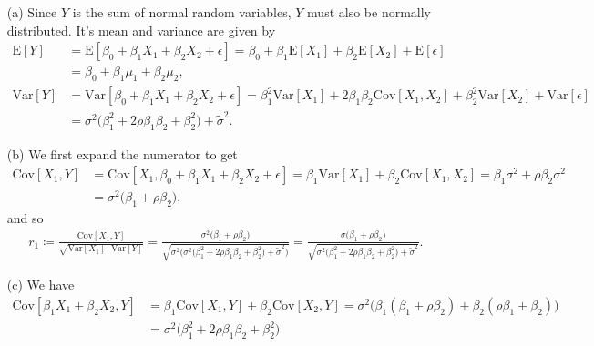 \documentclass[10pt]{article}
\begin{document}
\begin{itemize}
    \item[(a)] Since \(Y\) is the sum of normal random variables, \(Y\) must also be normally distributed. It's mean and variance are given by 
    \begin{align*}
        \mathrm{E}[Y]
        &= \mathrm{E}[\beta_0 + \beta_1 X_1 + \beta_2 X_2 + \epsilon]
        = \beta_0 + \beta_1 \mathrm{E}[X_1] + \beta_2 \mathrm{E}[X_2] + \mathrm{E}[\epsilon] \\
        &= \beta_0 + \beta_1 \mu_1 + \beta_2 \mu_2, \\
        \mathrm{Var}[Y]
        &= \mathrm{Var}[\beta_0 + \beta_1 X_1 + \beta_2 X_2 + \epsilon] 
        = \beta_1^2 \mathrm{Var}[X_1] + 2 \beta_1 \beta_2 \mathrm{Cov}[X_1, X_2] + \beta_2^2 \mathrm{Var}[X_2] + \mathrm{Var}[\epsilon] \\
        &= \sigma^2 \big( \beta_1^2 + 2 \rho \beta_1 \beta_2 + \beta_2^2 \big) + \tilde{\sigma}^2.
    \end{align*}
    \item[(b)] We first expand the numerator to get  
    \begin{align*}
        \mathrm{Cov}[X_1, Y]
        &= \mathrm{Cov}[X_1, \beta_0 + \beta_1 X_1 + \beta_2 X_2 + \epsilon]
        = \beta_1 \mathrm{Var}[X_1] + \beta_2 \mathrm{Cov}[X_1, X_2] 
        = \beta_1 \sigma^2 + \rho \beta_2 \sigma^2 \\
        &= \sigma^2 \big( \beta_1 + \rho \beta_2 \big),
    \end{align*}
    and so 
    \begin{align*}
        r_1 
        \coloneqq \frac{\mathrm{Cov}[X_1,Y]}{\sqrt{\mathrm{Var}[X_1] \cdot \mathrm{Var}[Y]}}
        = \frac{\sigma^2 \big( \beta_1 + \rho \beta_2 \big)}{\sqrt{\sigma^2 \Big( \sigma^2 \big( \beta_1^2 + 2 \rho \beta_1 \beta_2 + \beta_2^2 \big) + \tilde{\sigma}^2 \Big)}}
        = \frac{\sigma \big( \beta_1 + \rho \beta_2 \big)}{\sqrt{\sigma^2 \big( \beta_1^2 + 2 \rho \beta_1 \beta_2 + \beta_2^2 \big) + \tilde{\sigma}^2}}.
    \end{align*}
    \item[(c)] We have 
    \begin{align*}
        \mathrm{Cov}[\beta_1 X_1 + \beta_2 X_2, Y]
        &= \beta_1 \mathrm{Cov}[X_1, Y] + \beta_2 \mathrm{Cov}[X_2, Y]
        = \sigma^2 \Big( \beta_1 (\beta_1 + \rho \beta_2) + \beta_2 (\rho \beta_1 + \beta_2) \Big) \\
        &= \sigma^2 \big( \beta_1^2 + 2 \rho \beta_1 \beta_2 + \beta_2^2 \big)

\end{align*}
\end{itemize}
\end{document}
